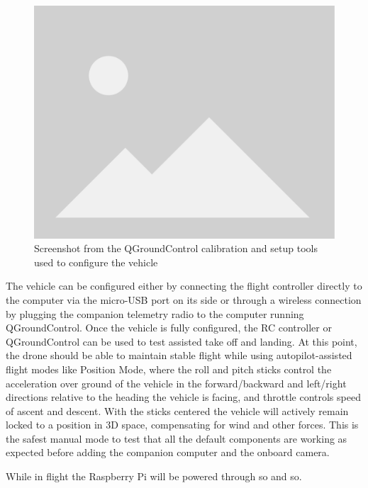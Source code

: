 \begin{figure}
  \centering
  \includegraphics[width=\textwidth, keepaspectratio]{img/placeholder.png}
  \caption{Screenshot from the QGroundControl calibration and setup tools used to configure the vehicle}\label{fig:qgc-config}
\end{figure}

The vehicle can be configured either by connecting the flight controller directly to the computer via the micro-USB port on its side or through a wireless connection by plugging the companion telemetry radio to the computer running QGroundControl.
Once the vehicle is fully configured, the RC controller or QGroundControl can be used to test assisted take off and landing.
At this point, the drone should be able to maintain stable flight while using autopilot-assisted flight modes like Position Mode, where the roll and pitch sticks control the acceleration over ground of the vehicle in the forward/backward and left/right directions relative to the heading the vehicle is facing, and throttle controls speed of ascent and descent. 
With the sticks centered the vehicle will actively remain locked to a position in 3D space, compensating for wind and other forces.
This is the safest manual mode to test that all the default components are working as expected before adding the companion computer and the onboard camera.


While in flight the Raspberry Pi will be powered through  so and so.

